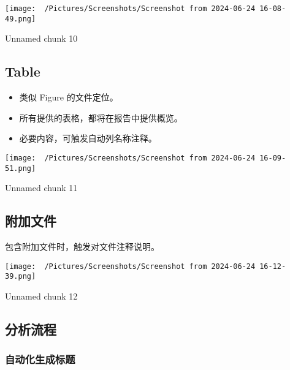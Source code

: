 \documentclass[
]{article}
\providecommand{\tightlist}{%
  \setlength{\itemsep}{0pt}\setlength{\parskip}{0pt}}
\begin{document}
\def\@captype{figure}
\begin{center}
\texttt{[image: ~/Pictures/Screenshots/Screenshot from 2024-06-24 16-08-49.png]}
\caption{Unnamed chunk 10}\label{fig:unnamed-chunk-10}
\end{center}

\hypertarget{table}{%
\subsection{Table}\label{table}}

\begin{itemize}
\tightlist
\item
  类似 Figure 的文件定位。
\item
  所有提供的表格，都将在报告中提供概览。
\item
  必要内容，可触发自动列名称注释。
\end{itemize}

\def\@captype{figure}
\begin{center}
\texttt{[image: ~/Pictures/Screenshots/Screenshot from 2024-06-24 16-09-51.png]}
\caption{Unnamed chunk 11}\label{fig:unnamed-chunk-11}
\end{center}

\hypertarget{ux9644ux52a0ux6587ux4ef6}{%
\subsection{附加文件}\label{ux9644ux52a0ux6587ux4ef6}}

包含附加文件时，触发对文件注释说明。

\def\@captype{figure}
\begin{center}
\texttt{[image: ~/Pictures/Screenshots/Screenshot from 2024-06-24 16-12-39.png]}
\caption{Unnamed chunk 12}\label{fig:unnamed-chunk-12}
\end{center}

\hypertarget{ux5206ux6790ux6d41ux7a0b}{%
\subsection{分析流程}\label{ux5206ux6790ux6d41ux7a0b}}

\hypertarget{ux81eaux52a8ux5316ux751fux6210ux6807ux9898}{%
\subsubsection{自动化生成标题}\label{ux81eaux52a8ux5316ux751fux6210ux6807ux9898}}
\end{document}
